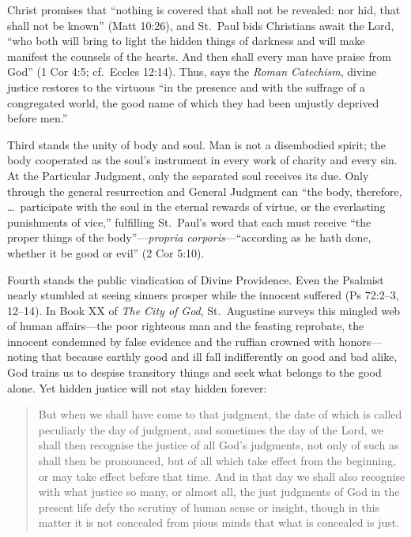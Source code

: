 Christ promises that ``nothing is covered that shall not be revealed: nor hid, that shall not be known'' (Matt 10:26), and St.\ Paul bids Christians await the Lord, ``who both will bring to light the hidden things of darkness and will make manifest the counsels of the hearts. And then shall every man have praise from God'' (1 Cor 4:5; cf.\ Eccles 12:14). Thus, says the \textit{Roman Catechism}, divine justice restores to the virtuous ``in the presence and with the suffrage of a congregated world, the good name of which they had been unjustly deprived before men.''

Third stands the unity of body and soul. Man is not a disembodied spirit; the body cooperated as the soul's instrument in every work of charity and every sin. At the Particular Judgment, only the separated soul receives its due. Only through the general resurrection and General Judgment can ``the body, therefore, \dots\ participate with the soul in the eternal rewards of virtue, or the everlasting punishments of vice,'' fulfilling St.\ Paul's word that each must receive ``the proper things of the body''---\textit{propria corporis}---``according as he hath done, whether it be good or evil'' (2 Cor 5:10).

Fourth stands the public vindication of Divine Providence. Even the Psalmist nearly stumbled at seeing sinners prosper while the innocent suffered (Ps 72:2--3, 12--14). In Book XX of \textit{The City of God}, St.\ Augustine surveys this mingled web of human affairs---the poor righteous man and the feasting reprobate, the innocent condemned by false evidence and the ruffian crowned with honors---noting that because earthly good and ill fall indifferently on good and bad alike, God trains us to despise transitory things and seek what belongs to the good alone. Yet hidden justice will not stay hidden forever:

\begin{quote}
But when we shall have come to that judgment, the date of which is called peculiarly the day of judgment, and sometimes the day of the Lord, we shall then recognise the justice of all God's judgments, not only of such as shall then be pronounced, but of all which take effect from the beginning, or may take effect before that time. And in that day we shall also recognise with what justice so many, or almost all, the just judgments of God in the present life defy the scrutiny of human sense or insight, though in this matter it is not concealed from pious minds that what is concealed is just.
\end{quote}

